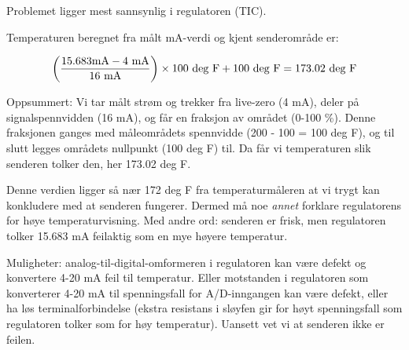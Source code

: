 












Problemet ligger mest sannsynlig i regulatoren (TIC).

\vskip 10pt

Temperaturen beregnet fra målt mA-verdi og kjent senderområde er:

$$\left({15.683 \hbox{mA} - 4 \hbox{ mA}} \over 16 \hbox{ mA}\right) \times 100 \hbox{ deg F} + 100 \hbox{ deg F} = 173.02 \hbox{ deg F}$$

Oppsummert: Vi tar målt strøm og trekker fra live-zero (4 mA), deler på signalspennvidden (16 mA), og får en fraksjon av området (0-100 \%). Denne fraksjonen ganges med måleområdets spennvidde (200 - 100 = 100 deg F), og til slutt legges områdets nullpunkt (100 deg F) til. Da får vi temperaturen slik senderen tolker den, her 173.02 deg F.

Denne verdien ligger så nær 172 deg F fra temperaturmåleren at vi trygt kan konkludere med at senderen fungerer. Dermed må noe {\it annet} forklare regulatorens for høye temperaturvisning. Med andre ord: senderen er frisk, men regulatoren tolker 15.683 mA feilaktig som en mye høyere temperatur.

Muligheter: analog-til-digital-omformeren i regulatoren kan være defekt og konvertere 4-20 mA feil til temperatur. Eller motstanden i regulatoren som konverterer 4-20 mA til spenningsfall for A/D-inngangen kan være defekt, eller ha løs terminalforbindelse (ekstra resistans i sløyfen gir for høyt spenningsfall som regulatoren tolker som for høy temperatur). Uansett vet vi at senderen ikke er feilen.


